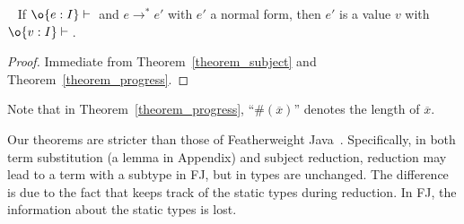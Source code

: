 \begin{theorem}~\label{theorem_soundness}
If $\judgeewf \o {e : I}$ and $e \to^* e'$ with $e'$ a normal form, then $e'$ is 
a value $v$ with $\judgeewf \o {v:I}$.
\end{theorem}
\begin{proof}
Immediate from Theorem~\ref{theorem_subject} and Theorem~\ref{theorem_progress}.
\end{proof}
Note that in Theorem~\ref{theorem_progress}, ``$\#(\overline{x})$'' denotes the length of
$\overline{x}$.

Our theorems are stricter than those of Featherweight Java~\cite{Igarashi01FJ}. Specifically, in both term substitution (a lemma in Appendix)
and subject reduction, reduction may lead to a term with a subtype in
FJ, but in \MIM{} types are unchanged. The difference is due to
the fact that \MIM{} keeps track of the static types during
reduction. 
In FJ, the information about the static types is lost. 

